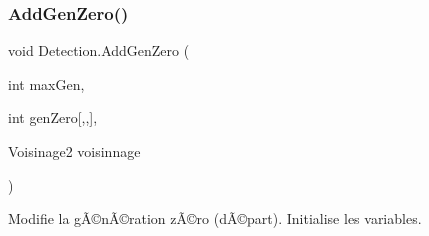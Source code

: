 \subsubsection{\texorpdfstring{Add\+Gen\+Zero()}{AddGenZero()}}
{\footnotesize\ttfamily void Detection.\+Add\+Gen\+Zero (\begin{DoxyParamCaption}\item[{int}]{max\+Gen,  }\item[{int}]{gen\+Zero\mbox{[},,\mbox{]},  }\item[{Voisinage2}]{voisinnage }\end{DoxyParamCaption})\hspace{0.3cm}{\ttfamily [inline]}}



Modifie la gÃ©nÃ©ration zÃ©ro (dÃ©part). Initialise les variables. 


